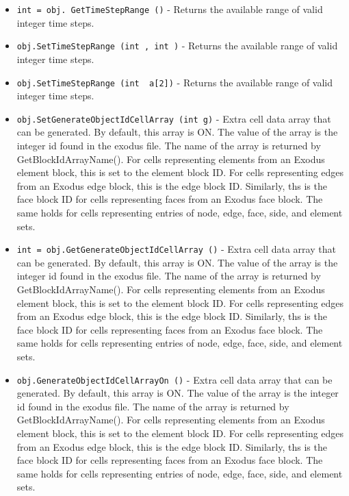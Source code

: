 \begin{itemize}
\item  \verb|int = obj. GetTimeStepRange ()| -  Returns the available range of valid integer time steps.

\item  \verb|obj.SetTimeStepRange (int , int )| -  Returns the available range of valid integer time steps.

\item  \verb|obj.SetTimeStepRange (int  a[2])| -  Returns the available range of valid integer time steps.

\item  \verb|obj.SetGenerateObjectIdCellArray (int g)| -  Extra cell data array that can be generated.  By default, this array
 is ON.  The value of the array is the integer id found
 in the exodus file. The name of the array is returned by 
 GetBlockIdArrayName(). For cells representing elements from
 an Exodus element block, this is set to the element block ID. For
 cells representing edges from an Exodus edge block, this is the
 edge block ID. Similarly, ths is the face block ID for cells
 representing faces from an Exodus face block. The same holds
 for cells representing entries of node, edge, face, side, and element sets.

\item  \verb|int = obj.GetGenerateObjectIdCellArray ()| -  Extra cell data array that can be generated.  By default, this array
 is ON.  The value of the array is the integer id found
 in the exodus file. The name of the array is returned by 
 GetBlockIdArrayName(). For cells representing elements from
 an Exodus element block, this is set to the element block ID. For
 cells representing edges from an Exodus edge block, this is the
 edge block ID. Similarly, ths is the face block ID for cells
 representing faces from an Exodus face block. The same holds
 for cells representing entries of node, edge, face, side, and element sets.

\item  \verb|obj.GenerateObjectIdCellArrayOn ()| -  Extra cell data array that can be generated.  By default, this array
 is ON.  The value of the array is the integer id found
 in the exodus file. The name of the array is returned by 
 GetBlockIdArrayName(). For cells representing elements from
 an Exodus element block, this is set to the element block ID. For
 cells representing edges from an Exodus edge block, this is the
 edge block ID. Similarly, ths is the face block ID for cells
 representing faces from an Exodus face block. The same holds
 for cells representing entries of node, edge, face, side, and element sets.


\end{itemize}
